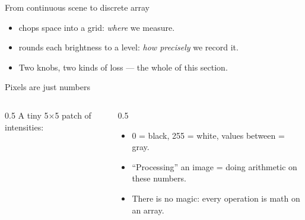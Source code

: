 \documentclass[10pt,aspectratio=169]{beamer}
\begin{document}
\begin{frame}{From continuous scene to discrete array}
  \begin{center}
  \end{center}
  \begin{itemize}
    \item {} chops space into a grid: \emph{where} we measure.
    \item {} rounds each brightness to a level: \emph{how precisely} we record it.
    \item Two knobs, two kinds of loss — the whole of this section.
  \end{itemize}
\end{frame}

\begin{frame}{Pixels are just numbers}
  \begin{columns}[T]
    \begin{column}{0.5\textwidth}
      A tiny 5$\times$5 patch of intensities:
      \begin{center}
      \end{center}
    \end{column}
    \begin{column}{0.5\textwidth}
      \begin{itemize}
        \item 0 = black, 255 = white, values between = gray.
        \item ``Processing'' an image = doing arithmetic on these numbers.
        \item There is no magic: every operation is math on an array.
      \end{itemize}
    \end{column}
  \end{columns}
\end{frame}
\end{document}
